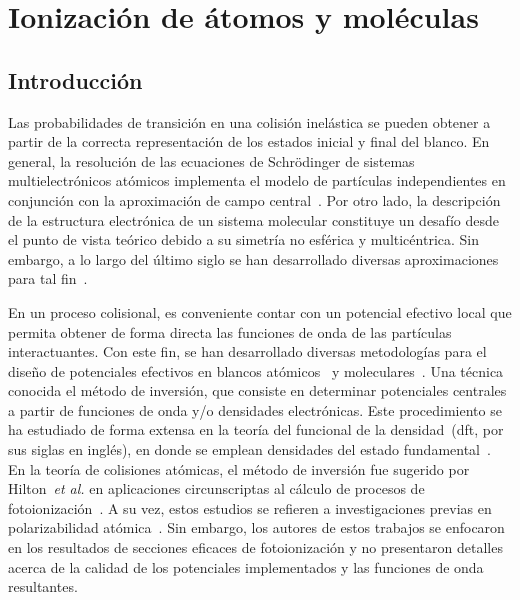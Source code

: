 \chapter{Ionización de átomos y moléculas}
\label{chap:iondim}

\section{Introducción}

Las probabilidades de transición en una colisión inelástica se pueden 
obtener a partir de la correcta representación de los estados inicial y 
final del blanco. En general, la resolución de las ecuaciones de 
Schr\"odinger de sistemas multielectrónicos atómicos implementa el 
modelo de partículas independientes en conjunción con la aproximación 
de campo central~\cite{Bransden:03,Cowan:81}. 
Por otro lado, la descripción de la estructura electrónica 
de un sistema molecular constituye un desafío desde el punto de vista 
teórico debido a su simetría no esférica y 
multicéntrica. Sin embargo, a lo largo del último siglo se han 
desarrollado diversas aproximaciones para tal 
fin~\cite{Helgaker:00,Schaefer:04}.

En un proceso colisional, es conveniente contar con un potencial 
efectivo local que permita obtener de forma directa las funciones de 
onda de las partículas interactuantes. Con este fin, se han desarrollado 
diversas metodologías para el diseño de potenciales efectivos en blancos 
atómicos~\cite{Hibbert:82,Gombas:56,Green:69,Klapisch:71,Phillips:59,
Herman:63,Dalgarno:70,Bayliss:77,Cowan:76,Lee:77} y 
moleculares~\cite{Menchero:10,Granados:16}. 
Una técnica conocida el método de inversión, que consiste en determinar 
potenciales centrales a partir de funciones de onda y/o densidades 
electrónicas. Este procedimiento se ha estudiado de forma extensa en la 
teoría del funcional de la densidad~(\acs{dft}, por sus siglas en 
inglés), en donde se emplean densidades del estado 
fundamental~\cite{Wu:03,Gaiduk:13,Ryabinkin:15,Schipper:97,deSilva:12,
Kananenka:13,Jacob:11}. En la teoría de colisiones atómicas, el método 
de inversión fue sugerido por Hilton~\textit{et al.} en aplicaciones 
circunscriptas al cálculo de procesos de fotoionización~\cite{Hilton:77,
Suzer:77,Hilton:79,Hilton:80,Crljen:87}. A su vez, estos estudios se 
refieren a investigaciones previas en polarizabilidad 
atómica~\cite{Sternheimer:54,Dalgarno:59}. Sin embargo, los autores de 
estos trabajos se enfocaron en los resultados de secciones eficaces de 
fotoionización y no presentaron detalles acerca de la calidad de los 
potenciales implementados y las funciones de onda resultantes. 

